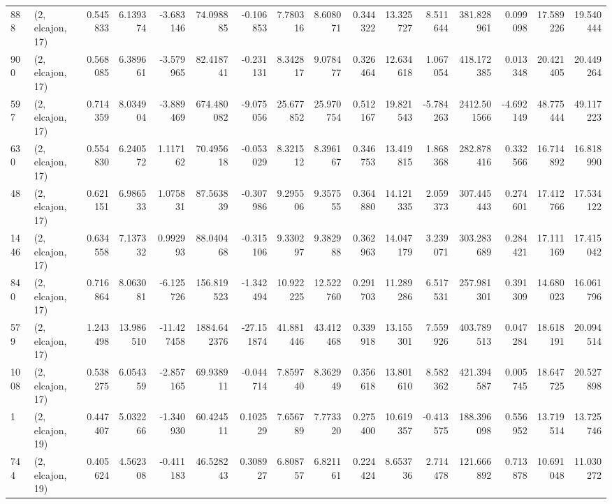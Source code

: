 \begin{tabular}{llrrrrrrrrrrrrrr}
888  &  (2, elcajon, 17) &   0.545833 &   6.139374 &  -3.683146 &     74.098885 &   -0.106853 &    7.780316 &    8.608071 &  0.344322 &  13.325727 &   8.511644 &   381.828961 &   0.099098 &  17.589226 &  19.540444 \\
900  &  (2, elcajon, 17) &   0.568085 &   6.389661 &  -3.579965 &     82.418741 &   -0.231131 &    8.342817 &    9.078477 &  0.326464 &  12.634618 &   1.067054 &   418.172385 &   0.013348 &  20.421405 &  20.449264 \\
597  &  (2, elcajon, 17) &   0.714359 &   8.034904 &  -3.889469 &    674.480082 &   -9.075056 &   25.677852 &   25.970754 &  0.512167 &  19.821543 &  -5.784263 &  2412.501566 &  -4.692149 &  48.775444 &  49.117223 \\
630  &  (2, elcajon, 17) &   0.554830 &   6.240572 &   1.117162 &     70.495618 &   -0.053029 &    8.321512 &    8.396167 &  0.346753 &  13.419815 &   1.868368 &   282.878416 &   0.332566 &  16.714892 &  16.818990 \\
48   &  (2, elcajon, 17) &   0.621151 &   6.986533 &   1.075831 &     87.563839 &   -0.307986 &    9.295506 &    9.357555 &  0.364880 &  14.121335 &   2.059373 &   307.445443 &   0.274601 &  17.412766 &  17.534122 \\
1446 &  (2, elcajon, 17) &   0.634558 &   7.137332 &   0.992993 &     88.040468 &   -0.315106 &    9.330297 &    9.382988 &  0.362963 &  14.047179 &   3.239071 &   303.283689 &   0.284421 &  17.111169 &  17.415042 \\
840  &  (2, elcajon, 17) &   0.716864 &   8.063081 &  -6.125726 &    156.819523 &   -1.342494 &   10.922225 &   12.522760 &  0.291703 &  11.289286 &   6.517531 &   257.981301 &   0.391309 &  14.680023 &  16.061796 \\
579  &  (2, elcajon, 17) &   1.243498 &  13.986510 & -11.427458 &   1884.642376 &  -27.151874 &   41.881446 &   43.412468 &  0.339918 &  13.155301 &   7.559926 &   403.789513 &   0.047284 &  18.618191 &  20.094514 \\
1008 &  (2, elcajon, 17) &   0.538275 &   6.054359 &  -2.857165 &     69.938911 &   -0.044714 &    7.859740 &    8.362949 &  0.356618 &  13.801610 &   8.582362 &   421.394587 &   0.005745 &  18.647725 &  20.527898 \\
1    &  (2, elcajon, 19) &   0.447407 &   5.032266 &  -1.340930 &     60.424511 &    0.102529 &    7.656789 &    7.773320 &  0.275400 &  10.619357 &  -0.413575 &   188.396098 &   0.556952 &  13.719514 &  13.725746 \\
744  &  (2, elcajon, 19) &   0.405624 &   4.562308 &  -0.411183 &     46.528243 &    0.308927 &    6.808757 &    6.821161 &  0.224424 &   8.653736 &   2.714478 &   121.666892 &   0.713878 &  10.691048 &  11.030272 \\

\end{tabular}

